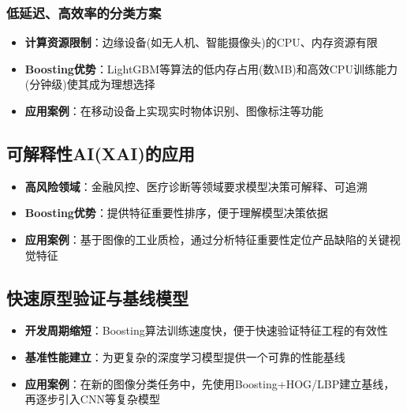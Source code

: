 \documentclass[UTF8]{report}
\theoremstyle{MyLineTheoremStyle} %
\theoremstyle{MyBlockTheoremStyle} %
\theoremstyle{MySubsubsectionStyle} %
\begin{document}
\subsubsection{低延迟、高效率的分类方案}
\begin{itemize}
    \item \textbf{计算资源限制}：边缘设备(如无人机、智能摄像头)的CPU、内存资源有限
    \item \textbf{Boosting优势}：LightGBM等算法的低内存占用(数MB)和高效CPU训练能力(分钟级)使其成为理想选择
    \item \textbf{应用案例}：在移动设备上实现实时物体识别、图像标注等功能
\end{itemize}

\subsection{可解释性AI(XAI)的应用}
\begin{itemize}
    \item \textbf{高风险领域}：金融风控、医疗诊断等领域要求模型决策可解释、可追溯
    \item \textbf{Boosting优势}：提供特征重要性排序，便于理解模型决策依据
    \item \textbf{应用案例}：基于图像的工业质检，通过分析特征重要性定位产品缺陷的关键视觉特征
\end{itemize}

\subsection{快速原型验证与基线模型}
\begin{itemize}
    \item \textbf{开发周期缩短}：Boosting算法训练速度快，便于快速验证特征工程的有效性
    \item \textbf{基准性能建立}：为更复杂的深度学习模型提供一个可靠的性能基线
    \item \textbf{应用案例}：在新的图像分类任务中，先使用Boosting+HOG/LBP建立基线，再逐步引入CNN等复杂模型
\end{itemize}

\newpage
\end{document}
